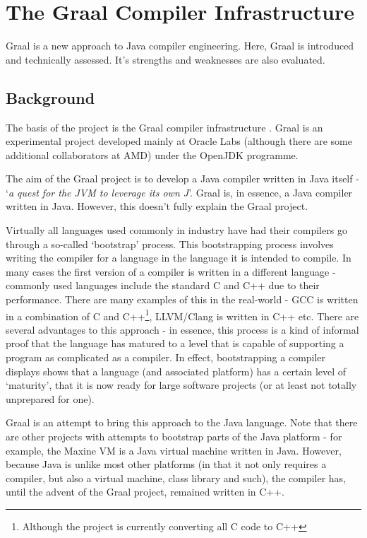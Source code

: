 \chapter{The Graal Compiler Infrastructure} \label{chp:graal}
Graal is a new approach to Java compiler engineering. Here, Graal is introduced and technically assessed. It's strengths and weaknesses are also evaluated.

\section{Background} \label{sec:graal/background}
The basis of the project is the Graal compiler infrastructure \citep{Graal}. Graal is an experimental project developed mainly at Oracle Labs (although there are some additional collaborators at AMD) under the OpenJDK programme.
	
The aim of the Graal project is to develop a Java compiler written in Java itself - `\textit{a quest for the JVM to leverage its own J}'. Graal is, in essence, a Java compiler written in Java. However, this doesn't fully explain the Graal project.
	
Virtually all languages used commonly in industry have had their compilers go through a so-called `bootstrap' process. This bootstrapping process involves writing the compiler for a language in the language it is intended to compile. In many cases the first version of a compiler is written in a different language - commonly used languages include the standard C and C++ due to their performance. There are many examples of this in the real-world - GCC is written in a combination of C and C++\footnote{Although the project is currently converting all C code to C++}, LLVM/Clang is written in C++ etc. There are several advantages to this approach - in essence, this process is a kind of informal proof that the language has matured to a level that is capable of supporting a program as complicated as a compiler. In effect, bootstrapping a compiler displays shows that a language (and associated platform) has a certain level of `maturity', that it is now ready for large software projects (or at least not totally unprepared for one).

Graal is an attempt to bring this approach to the Java language. Note that there are other projects with attempts to bootstrap parts of the Java platform - for example, the Maxine VM is a Java virtual machine written in Java. However, because Java is unlike most other platforms (in that it not only requires a compiler, but also a virtual machine, class library and such), the compiler has, until the advent of the Graal project, remained written in C++.

